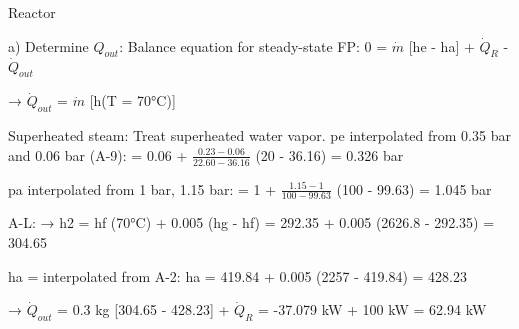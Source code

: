 Reactor  

a) Determine \( Q_{out} \):  
Balance equation for steady-state FP:  
0 = \( \dot{m} \) [he - ha] + \( \dot{Q}_R \) - \( \dot{Q}_{out} \)  

→ \( \dot{Q}_{out} \) = \( \dot{m} \) [h(T = 70°C)]  

Superheated steam: Treat superheated water vapor.  
pe interpolated from 0.35 bar and 0.06 bar (A-9):  
= 0.06 + \( \frac{0.23 - 0.06}{22.60 - 36.16} \) (20 - 36.16)  
= 0.326 bar  

pa interpolated from 1 bar, 1.15 bar:  
= 1 + \( \frac{1.15 - 1}{100 - 99.63} \) (100 - 99.63)  
= 1.045 bar  

A-L:  
→ h2 = hf (70°C) + 0.005 (hg - hf)  
= 292.35 + 0.005 (2626.8 - 292.35)  
= 304.65  

ha = interpolated from A-2:  
ha = 419.84 + 0.005 (2257 - 419.84)  
= 428.23  

→ \( \dot{Q}_{out} \) = 0.3 kg [304.65 - 428.23] + \( \dot{Q}_R \)  
= -37.079 kW + 100 kW = 62.94 kW